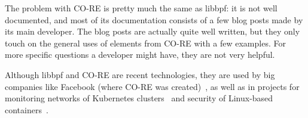 The problem with \ac{CO-RE} is pretty much the same as libbpf: it is not well
documented, and most of its documentation consists of a few blog posts made by
its main developer. The blog posts are actually quite well written, but they
only touch on the general uses of elements from \ac{CO-RE} with a few examples.
For more specific questions a developer might have, they are not very helpful.

Although libbpf and \ac{CO-RE} are recent technologies, they are used by big
companies like Facebook (where \ac{CO-RE} was created)~\cite{fbslide}, as well
as in projects for monitoring networks of Kubernetes clusters~\cite{kuber} and
security of Linux-based containers~\cite{sec}.
